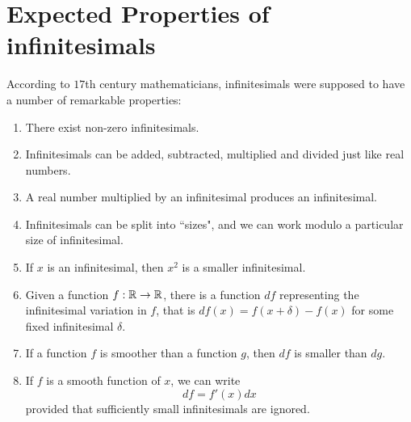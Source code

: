 \section{Expected Properties of infinitesimals}
According to $17$th century mathematicians, infinitesimals were supposed
to have a number of remarkable properties:
\begin{enumerate}
    \item{} There exist non-zero infinitesimals.
    \item{} Infinitesimals can be added, subtracted, multiplied and divided
    just like real numbers.
    \item{} A real number multiplied by an infinitesimal produces an infinitesimal.
    \item{} Infinitesimals can be split into ``sizes", and we can work modulo
    a particular size of infinitesimal.
    \item{} If $x$ is an infinitesimal, then $x^2$ is a smaller infinitesimal.
    \item{} Given a function $f:\mathbb{R}\rightarrow\mathbb{R}$, there is a function $df$
    representing the infinitesimal variation in $f$, that is $df(x) = f(x+\delta)-f(x)$
    for some fixed infinitesimal $\delta$.
    \item{} If a function $f$ is smoother than a function $g$, then $df$ is smaller
    than $dg$.
    \item{} If $f$ is a smooth function of $x$, we can write
    \begin{equation}
        df = f'(x)dx
    \end{equation}
    provided that sufficiently small infinitesimals are ignored.
\end{enumerate}

